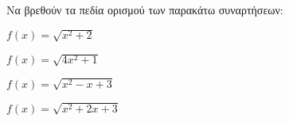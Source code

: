 Να βρεθούν τα πεδία ορισμού των παρακάτω συναρτήσεων:
\begin{alist}
\item $ f(x)=\sqrt{x^2+2} $
\item $ f(x)=\sqrt{4x^2+1} $
\item $ f(x)=\sqrt{x^2-x+3} $
\item $ f(x)=\sqrt{x^2+2x+3} $
\end{alist}
